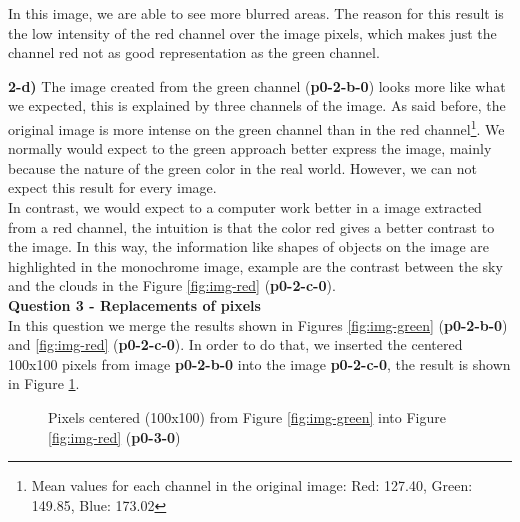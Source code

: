 \documentclass[12pt,a4paper]{article}
\begin{document}
In this image, we are able to see more blurred areas. The reason for this result is the low intensity of the red channel over the image pixels, which makes just the channel red not as good representation as the green channel.

\textbf{2-d) } The image created from the green channel (\textbf{p0-2-b-0}) looks more like what we expected, this is explained by three channels of the image. As said before, the original image is more intense on the green channel than in the red channel\footnote{Mean values for each channel in the original image: Red: 127.40, Green: 149.85, Blue: 173.02}. We normally would expect to the green approach better express the image, mainly because the nature of the green color in the real world. However, we can not expect this result for every image. \\

In contrast, we would expect to a computer work better in a image extracted from a red channel, the intuition is that the color red gives a better contrast to the image. In this way, the information like shapes of objects on the image are highlighted in the monochrome image, example are the contrast between the sky and the clouds in the Figure \ref{fig:img-red} (\textbf{p0-2-c-0}). \\

\textbf{Question 3 - Replacements of pixels} \\

In this question we merge the results shown in Figures \ref{fig:img-green} (\textbf{p0-2-b-0}) and \ref{fig:img-red} (\textbf{p0-2-c-0}). In order to do that, we inserted the centered 100x100 pixels from image \textbf{p0-2-b-0} into the image \textbf{p0-2-c-0}, the result is shown in Figure \ref{fig:p0-3-0}. 


\begin{figure}[!h]
	\centering
	{%
		\setlength{\fboxsep}{1pt}%
		\setlength{\fboxrule}{1pt}%
	}%
	\caption{Pixels centered (100x100) from Figure \ref{fig:img-green} into Figure \ref{fig:img-red} (\textbf{p0-3-0})}
	\label{fig:p0-3-0}
\end{figure}
\end{document}
